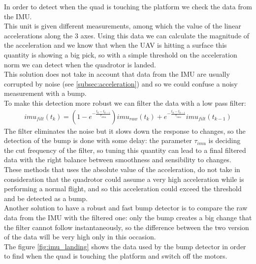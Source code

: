 In order to detect when the quad is touching the platform we check the data from the IMU. \\
This unit is given different measurements, among which the value of the linear accelerations along the 3 axes. Using this data we can calculate the magnitude of the acceleration and we know that when the UAV is hitting a surface this quantity is showing a big pick, so with a simple threshold on the acceleration norm we can detect when the quadrotor is landed.\\
This solution does not take in account that data from the IMU are usually corrupted by noise (see \ref{subsec:acceleration}) and so we could confuse a noisy measurement with a bump. \\
To make this detection more robust we can filter the data with a low pass filter:
\begin{align}
imu_{filt}(t_k) =  (1-e^{-\frac{t_k-t_{k-1}}{\tau_{imu}}})imu_{raw}(t_k) + e^{-\frac{t_k-t_{k-1}}{\tau_{imu}}} imu_{filt}(t_{k-1})
\label{eq:imu_filtered}
\end{align} 
The filter eliminates the noise but it slows down the response to changes, so the detection of the bump is done with some delay: the parameter $\tau_{imu}$ is deciding the cut frequency of the filter, so tuning this quantity can lead to a final filtered data with the right balance between smoothness and sensibility to changes.\\  
These methods that uses the absolute value of the acceleration, do not take in consideration that the quadrotor could assume a very high acceleration while is performing a normal flight, and so this acceleration could exceed the threshold and be detected as a bump.\\
Another solution to have a robust and fast bump detector is to compare the raw data from the IMU with the filtered one: only the bump creates a big change that the filter cannot follow instantaneously, so the difference between the two version of the data will be very high only in this occasion.\\
The figure \ref{fig:imu_landing} shows the data used by the bump detector in order to find when the quad is touching the platform and switch off the motors.

